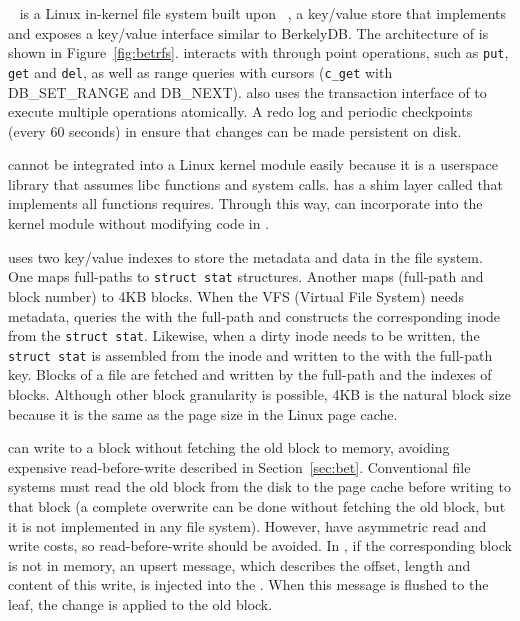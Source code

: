 \betrfs~\citep{betrfs1,betrfs1tos} is a Linux in-kernel file
system built upon \fti~\citep{fti}, a key/value store that implements \bets and
exposes a key/value interface similar to BerkelyDB.
The architecture of \betrfs is shown in Figure~\ref{fig:betrfs}.
\betrfs interacts with \fti through point operations, such as \texttt{put},
\texttt{get} and \texttt{del}, as well as range queries with cursors
(\texttt{c\_get} with DB\_SET\_RANGE and DB\_NEXT).
\betrfs also uses the transaction interface of \fti to execute multiple
operations atomically.
A redo log and periodic checkpoints (every 60 seconds) in \fti ensure that
changes can be made persistent on disk.

\Fti cannot be integrated into a Linux kernel module easily because
it is a userspace library that assumes libc functions and system calls.
\betrfs has a shim layer called \klibc that implements all functions \fti
requires.
Through this way, \betrfs can incorporate \fti into the kernel module without
modifying code in \fti.

\betrfs uses two key/value indexes to store the metadata and data in the file
system.
One \mdb maps full-paths to \texttt{struct stat} structures.
Another \ddb maps (full-path and block number) to 4KB blocks.
When the VFS (Virtual File System) needs metadata, \betrfs queries
the \mdb with the full-path and constructs the corresponding inode
from the \texttt{struct stat}.
Likewise, when a dirty inode needs to be written, the \texttt{struct stat} is
assembled from the inode and written to the \mdb with the
full-path key.
Blocks of a file are fetched and written by the full-path and the indexes of
blocks.
Although other block granularity is possible, 4KB is the natural block size
because it is the same as the page size in the Linux page cache.

\betrfs can write to a block without fetching the old block to memory, avoiding
expensive read-before-write described in Section~\ref{sec:bet}.
Conventional file systems must read the old block from the disk to the page
cache before writing to that block (a complete overwrite can be done without
fetching the old block, but it is not implemented in any file system).
However, \bets have asymmetric read and write costs, so read-before-write should
be avoided.
In \betrfs, if the corresponding block is not in memory, an upsert message,
which describes the offset, length and content of this write, is injected into
the \bet.
When this message is flushed to the leaf, the change is applied to the old
block.

